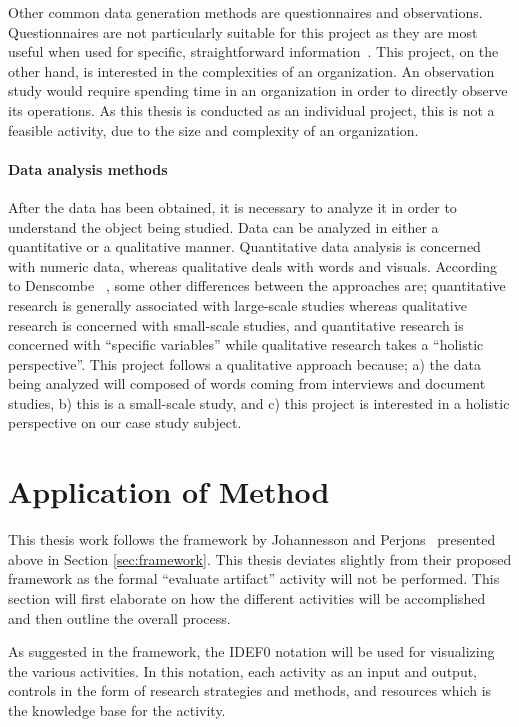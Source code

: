 Other common data generation methods are questionnaires and observations. Questionnaires are not particularly suitable for this project as they are most useful when used for specific, straightforward information~\cite{denscombe2010good}. This project, on the other hand, is interested in the complexities of an organization. An observation study would require spending time in an organization in order to directly observe its operations. As this thesis is conducted as an individual project, this is not a feasible activity, due to the size and complexity of an organization.

\paragraph*{Data analysis methods}

After the data has been obtained, it is necessary to analyze it in order to understand the object being studied. Data can be analyzed in either a quantitative or a qualitative manner. Quantitative data analysis is concerned with numeric data, whereas qualitative deals with words and visuals. According to Denscombe ~\cite{denscombe2010good}, some other differences between the approaches are; quantitative research is generally associated with large-scale studies whereas qualitative research is concerned with small-scale studies, and quantitative research is concerned with ``specific variables'' while qualitative research takes a ``holistic perspective''. This project follows a qualitative approach because; a) the data being analyzed will composed of words coming from interviews and document studies, b) this is a small-scale study, and c) this project is interested in a holistic perspective on our case study subject.

\section{Application of Method}

This thesis work follows the framework by Johannesson and Perjons~\cite[Ch. 4]{johannessonPerjons2012} presented above in Section \ref{sec:framework}. This thesis deviates slightly from their proposed framework as the formal ``evaluate artifact'' activity will not be performed. This section will first elaborate on how the different activities will be accomplished and then outline the overall process. 

As suggested in the framework, the IDEF0 notation will be used for visualizing the various activities. In this notation, each activity as an input and output, controls in the form of research strategies and methods, and resources which is the knowledge base for the activity. 

